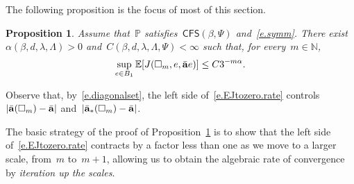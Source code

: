 \documentclass[11pt]{article} %
\let\oldsquare\square %
\renewcommand{\square}{\oldsquare}
\numberwithin{equation}{section}
\newtheorem{proposition}[theorem]{Proposition}
\theoremstyle{definition}
\let\originalleft\left
\let\originalright\right
\renewcommand{\left}{\mathopen{}\mathclose\bgroup\originalleft}
\renewcommand{\right}{\aftergroup\egroup\originalright}
\newcommand*{\N}{\ensuremath{\mathbb{N}}}
\renewcommand{\a}{\mathbf{a}}
\newcommand{\ahom}{\bar{\a}}
\newcommand{\cu}{\square}
\renewcommand{\P}{\mathbb{P}}
\newcommand{\E}{\mathbb{E}}
\newcommand{\CFS}{\mathsf{CFS}}
\begin{document}
\smallskip

The following proposition is the focus of most of this section. 

\begin{proposition}
\label{p.algebraicrate.E}
Assume that~$\P$ satisfies~$\CFS(\beta,\Psi)$ and~\eqref{e.symm}.
There exist~$\alpha(\beta,d,\lambda,\Lambda) >0$ and~$C(\beta,d,\lambda,\Lambda,\Psi)<\infty$
such that, for every~$m\in\N$,  
\begin{align}
\label{e.EJtozero.rate}
\sup_{e\in B_1}
\E \left[ J(\cu_m,e,\ahom e) \right] 
\leq 
C3^{-m\alpha}. 
\end{align}
\end{proposition}

Observe that, by~\eqref{e.diagonalset}, the left side of~\eqref{e.EJtozero.rate} controls~$\left|\ahom (\cu_m) - \ahom\right|$ and~$\left|  \ahom_*(\cu_m) - \ahom\right|$. 

\smallskip

The basic strategy of the proof of Proposition~\ref{p.algebraicrate.E} is to show that the left side of~\eqref{e.EJtozero.rate} contracts by a factor less than one as we move to a larger scale, from~$m$ to~$m+1$, 
allowing us to obtain the algebraic rate of convergence by \emph{iteration up the scales}.

\smallskip
\end{document}
